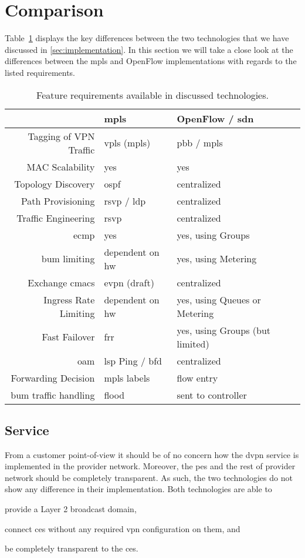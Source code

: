 \section{Comparison} %
\label{sec:results}

Table~\ref{tb:reqs} displays the key differences between the two technologies that we have discussed in \ref{sec:implementation}. In this section we will take a close look at the differences between the \ac{mpls} and OpenFlow implementations with regards to the listed requirements.

\begin{table}[h]
	\centering
	\begin{tabular}{r|lll}
	 & \acs{mpls} & OpenFlow / \acs{sdn}\\
	\hline
	Tagging of VPN Traffic & \acs{vpls} (\acs{mpls}) & \acs{pbb} / \acs{mpls}\\
	MAC Scalability & yes & yes\\
	Topology Discovery & \acs{ospf} & centralized\\
	Path Provisioning & \acs{rsvp} / \acs{ldp} & centralized\\
	Traffic Engineering & \acs{rsvp} & centralized\\
	\ac{ecmp} & yes & yes, using Groups\\
	\ac{bum} limiting & dependent on \acs{hw} & yes, using Metering\\
	Exchange \acsp{cmac} & \ac{evpn} (draft) & centralized\\
	Ingress Rate Limiting & dependent on \acs{hw} & yes, using Queues or Metering\\
	Fast Failover & \acs{frr} & yes, using Groups (but limited)\\
	\acs{oam} & \acs{lsp} Ping / \acs{bfd} & centralized\\
	\hline
	Forwarding Decision & \acs{mpls} labels & flow entry \\
	\ac{bum} traffic handling & flood & sent to controller\\
	\end{tabular}
	\caption{Feature requirements available in discussed technologies.}
	\label{tb:reqs}
\end{table}

\subsection{Service} %
\label{sub:service}

From a customer point-of-view it should be of no concern how the \ac{dvpn} service is implemented in the provider network. Moreover, the \acp{pe} and the rest of provider network should be completely transparent. As such, the two technologies do not show any difference in their implementation. Both technologies are able to 
\begin{inparaenum}[\itshape 1\upshape)]
	\item provide a Layer 2 broadcast domain,
	\item connect \acp{ce} without any required \ac{vpn} configuration on them, and
	\item be completely transparent to the \acp{ce}.
\end{inparaenum}

